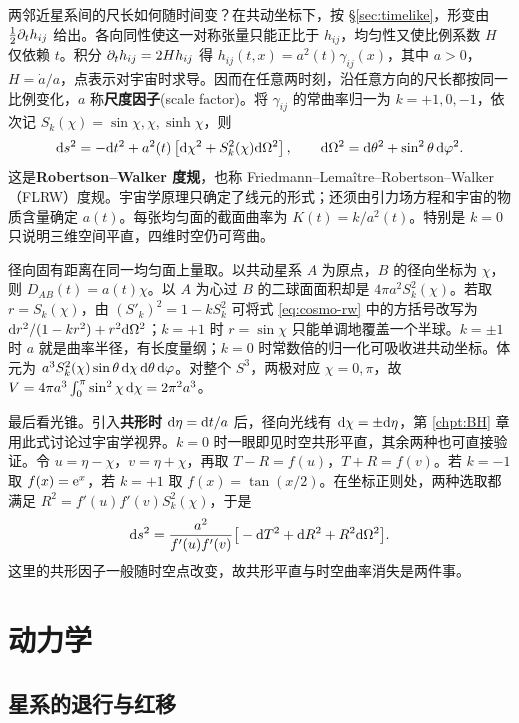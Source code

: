 两邻近星系间的尺长如何随时间变？在共动坐标下，按 \S\ref{sec:timelike}，形变由 $\tfrac12\partial_t h_{ij}$ 给出。各向同性使这一对称张量只能正比于 $h_{ij}$，均匀性又使比例系数 $H$ 仅依赖 $t$。积分 $\partial_t h_{ij}=2Hh_{ij}$ 得 $h_{ij}(t,x)=a^2(t)\gamma_{ij}(x)$，其中 $a>0$，$H=\dot a/a$，点表示对宇宙时求导。因而在任意两时刻，沿任意方向的尺长都按同一比例变化，$a$ 称\textbf{尺度因子}(scale factor)。将 $\gamma_{ij}$ 的常曲率归一为 $k=+1,0,-1$，依次记 $S_k(\chi)=\sin\chi,\chi,\sinh\chi$，则
\begin{equation}\label{eq:cosmo-rw}
    \dd s^2=-\dd t^2+a^2(t)\left[\dd\chi^2+S_k^2(\chi)\dd\Omega^2\right],
    \qquad \dd\Omega^2=\dd\theta^2+\sin^2\theta\,\dd\varphi^2 .
\end{equation}
这是\textbf{Robertson--Walker 度规}，也称 Friedmann--Lemaître--Robertson--Walker（FLRW）度规。宇宙学原理只确定了线元的形式；还须由引力场方程和宇宙的物质含量确定 $a(t)$。每张均匀面的截面曲率为 $K(t)=k/a^2(t)$。特别是 $k=0$ 只说明三维空间平直，四维时空仍可弯曲。

径向固有距离在同一均匀面上量取。以共动星系 $A$ 为原点，$B$ 的径向坐标为 $\chi$，则 $D_{AB}(t)=a(t)\chi$。以 $A$ 为心过 $B$ 的二球面面积却是 $4\pi a^2 S_k^2(\chi)$。若取 $r=S_k(\chi)$，由 $(S'_k)^2=1-k S_k^2$ 可将式 \eqref{eq:cosmo-rw} 中的方括号改写为 $\dd r^2/(1-kr^2)+r^2\dd\Omega^2$；$k=+1$ 时 $r=\sin\chi$ 只能单调地覆盖一个半球。$k=\pm1$ 时 $a$ 就是曲率半径，有长度量纲；$k=0$ 时常数倍的归一化可吸收进共动坐标。体元为 $a^3 S_k^2(\chi)\sin\theta\,\dd\chi\,\dd\theta\,\dd\varphi$。对整个 $S^3$，两极对应 $\chi=0,\pi$，故 $V=4\pi a^3\int_0^\pi\sin^2\chi\,\dd\chi=2\pi^2a^3$。

最后看光锥。引入\textbf{共形时} $\dd\eta=\dd t/a$ 后，径向光线有 $\dd\chi=\pm\dd\eta$，第 \ref{chpt:BH} 章用此式讨论过宇宙学视界。$k=0$ 时一眼即见时空共形平直，其余两种也可直接验证。令 $u=\eta-\chi$，$v=\eta+\chi$，再取 $T-R=f(u)$，$T+R=f(v)$。若 $k=-1$ 取 $f(x)=\mathrm{e}^x$，若 $k=+1$ 取 $f(x)=\tan(x/2)$。在坐标正则处，两种选取都满足 $R^2=f'(u)f'(v)S_k^2(\chi)$，于是
\[
    \dd s^2=\frac{a^2}{f'(u)f'(v)}
    \big[-\dd T^2+\dd R^2+R^2\dd\Omega^2\big].
\]
这里的共形因子一般随时空点改变，故共形平直与时空曲率消失是两件事。

\section{动力学}\label{sec:cosmo-dynamics}

\subsection{星系的退行与红移}

